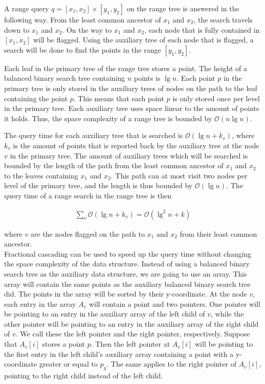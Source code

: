 A range query $q = [x_1, x_2] \times [y_1, y_2]$ on the range tree is answered in the following way. From the least common ancestor of $x_1$ and $x_2$, the search travels down to $x_1$ and $x_2$. On the way to $x_1$ and $x_2$, each node that is fully contained in $[x_1, x_2]$ will be flagged. Using the auxiliary tree of each node that is flagged, a search will be done to find the points in the range $[y_1, y_2]$.

Each leaf in the primary tree of the range tree stores a point. The height of a balanced binary search tree containing $n$ points is $\lg n$. Each point $p$ in the primary tree is only stored in the auxiliary trees of nodes on the path to the leaf containing the point $p$. This means that each point $p$ is only stored once per level in the primary tree. Each auxiliary tree uses space linear to the amount of points it holds. Thus, the space complexity of a range tree is bounded by $\mathcal{O}(n \lg n)$.

The query time for each auxiliary tree that is searched is $\mathcal{O}(\lg n + k_v)$, where $k_v$ is the amount of points that is reported back by the auxiliary tree at the node $v$ in the primary tree. The amount of auxiliary trees which will be searched is bounded by the length of the path from the least common ancestor of $x_1$ and $x_2$ to the leaves containing $x_1$ and $x_2$. This path can at most visit two nodes per level of the primary tree, and the length is thus bounded by $\mathcal{O}(\lg n)$. The query time of a range search in the range tree is then 

\begin{align*}
  \sum\limits_{v} \mathcal{O}(\lg n + k_v) = \mathcal{O}(\lg^2 n + k)
\end{align*}

\noindent where $v$ are the nodes flagged on the path to $x_1$ and $x_2$ from their least common ancestor. \\

Fractional cascading can be used to speed up the query time without changing the space complexity of the data structure. Instead of using a balanced binary search tree as the auxiliary data structure, we are going to use an array. This array will contain the same points as the auxiliary balanced binary search tree did. The points in the array will be sorted by their y-coordinate. At the node $v$, each entry in the array $A_v$ will contain a point and two pointers. One pointer will be pointing to an entry in the auxiliary array of the left child of $v$, while the other pointer will be pointing to an entry in the auxiliary array of the right child of $v$. We call these the left pointer and the right pointer, respectively. Suppose that $A_v[i]$ stores a point $p$. Then the left pointer at $A_v[i]$ will be pointing to the first entry in the left child's auxiliary array containing a point with a y-coordinate greater or equal to $p_y$. The same applies to the right pointer of $A_v[i]$, pointing to the right child instead of the left child. \\

